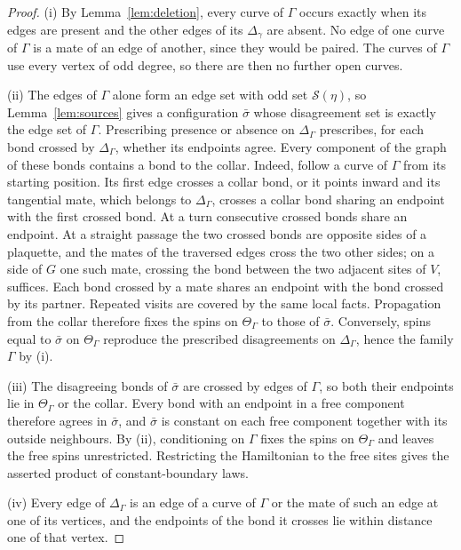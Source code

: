 \begin{proof}
(i) By Lemma~\ref{lem:deletion}, every curve of $\Gamma$ occurs exactly when its edges are present and the other edges of its $\Delta_\gamma$ are absent. No edge of one curve of $\Gamma$ is a mate of an edge of another, since they would be paired. The curves of $\Gamma$ use every vertex of odd degree, so there are then no further open curves.

(ii) The edges of $\Gamma$ alone form an edge set with odd set $\mathcal S(\eta)$, so Lemma~\ref{lem:sources} gives a configuration $\bar\sigma$ whose disagreement set is exactly the edge set of $\Gamma$. Prescribing presence or absence on $\Delta_\Gamma$ prescribes, for each bond crossed by $\Delta_\Gamma$, whether its endpoints agree. Every component of the graph of these bonds contains a bond to the collar. Indeed, follow a curve of $\Gamma$ from its starting position. Its first edge crosses a collar bond, or it points inward and its tangential mate, which belongs to $\Delta_\Gamma$, crosses a collar bond sharing an endpoint with the first crossed bond. At a turn consecutive crossed bonds share an endpoint. At a straight passage the two crossed bonds are opposite sides of a plaquette, and the mates of the traversed edges cross the two other sides; on a side of $G$ one such mate, crossing the bond between the two adjacent sites of $V$, suffices. Each bond crossed by a mate shares an endpoint with the bond crossed by its partner. Repeated visits are covered by the same local facts. Propagation from the collar therefore fixes the spins on $\Theta_\Gamma$ to those of $\bar\sigma$. Conversely, spins equal to $\bar\sigma$ on $\Theta_\Gamma$ reproduce the prescribed disagreements on $\Delta_\Gamma$, hence the family $\Gamma$ by (i).

(iii) The disagreeing bonds of $\bar\sigma$ are crossed by edges of $\Gamma$, so both their endpoints lie in $\Theta_\Gamma$ or the collar. Every bond with an endpoint in a free component therefore agrees in $\bar\sigma$, and $\bar\sigma$ is constant on each free component together with its outside neighbours. By (ii), conditioning on $\Gamma$ fixes the spins on $\Theta_\Gamma$ and leaves the free spins unrestricted. Restricting the Hamiltonian to the free sites gives the asserted product of constant-boundary laws.

(iv) Every edge of $\Delta_\Gamma$ is an edge of a curve of $\Gamma$ or the mate of such an edge at one of its vertices, and the endpoints of the bond it crosses lie within distance one of that vertex.
\end{proof}
